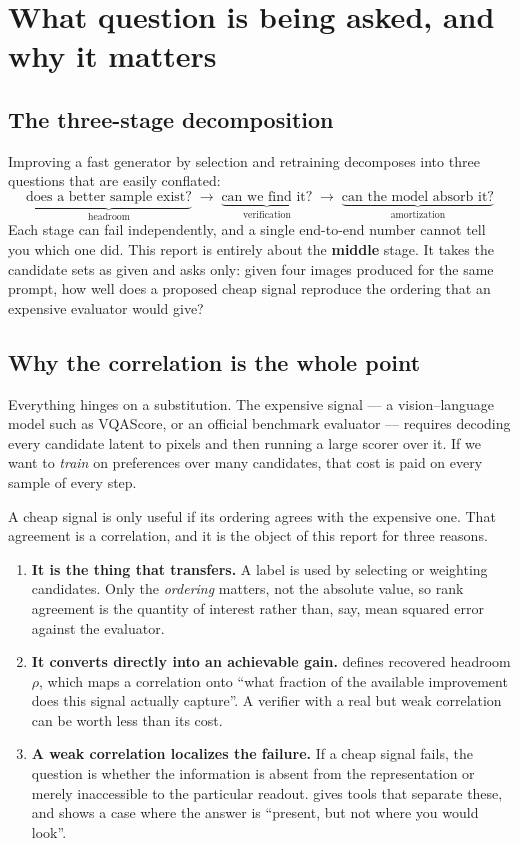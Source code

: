 \documentclass[10pt]{article}
\begin{document}
\section{What question is being asked, and why it matters}
\label{sec:why}

\subsection{The three-stage decomposition}

Improving a fast generator by selection and retraining decomposes into three questions that are
easily conflated:
\[
  \underbrace{\text{does a better sample exist?}}_{\text{headroom}}
  \;\longrightarrow\;
  \underbrace{\text{can we find it?}}_{\text{verification}}
  \;\longrightarrow\;
  \underbrace{\text{can the model absorb it?}}_{\text{amortization}}
\]
Each stage can fail independently, and a single end-to-end number cannot tell you which one did.
This report is entirely about the \textbf{middle} stage. It takes the candidate sets as given and
asks only: given four images produced for the same prompt, how well does a proposed cheap signal
reproduce the ordering that an expensive evaluator would give?

\subsection{Why the correlation is the whole point}

Everything hinges on a substitution. The expensive signal --- a vision--language model such as
VQAScore, or an official benchmark evaluator --- requires decoding every candidate latent to pixels
and then running a large scorer over it. If we want to \emph{train} on preferences over many
candidates, that cost is paid on every sample of every step.

A cheap signal is only useful if its ordering agrees with the expensive one. That agreement is a
correlation, and it is the object of this report for three reasons.

\begin{enumerate}
  \item \textbf{It is the thing that transfers.} A label is used by selecting or weighting
    candidates. Only the \emph{ordering} matters, not the absolute value, so rank agreement is the
    quantity of interest rather than, say, mean squared error against the evaluator.
  \item \textbf{It converts directly into an achievable gain.}  defines
    recovered headroom $\rho$, which maps a correlation onto ``what fraction of the available
    improvement does this signal actually capture''. A verifier with a real but weak correlation
    can be worth less than its cost.
  \item \textbf{A weak correlation localizes the failure.} If a cheap signal fails, the question is
    whether the information is absent from the representation or merely inaccessible to the
    particular readout.  gives tools that separate these, and
     shows a case where the answer is ``present, but not where you would look''.
\end{enumerate}
\end{document}
